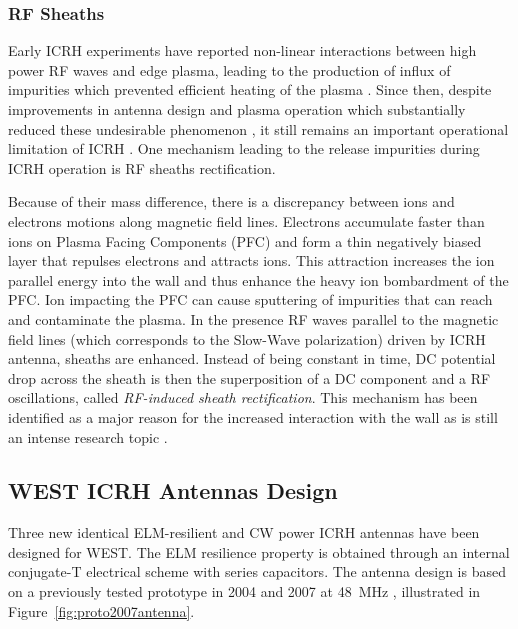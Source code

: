 \subsubsection{RF Sheaths}
Early ICRH experiments have reported non-linear interactions between high power RF waves and edge plasma, leading to the production of influx of impurities which prevented efficient heating of the plasma . Since then, despite improvements in antenna design and plasma operation which substantially reduced these undesirable phenomenon , it still remains an important operational limitation of ICRH . One mechanism leading to the release impurities during ICRH operation is RF sheaths rectification. 

Because of their mass difference, there is a discrepancy between ions and electrons motions along magnetic field lines. Electrons accumulate faster than ions on Plasma Facing Components (PFC) and form a thin negatively biased layer that repulses electrons and attracts ions. This attraction increases the ion parallel energy into the wall and thus enhance the heavy ion bombardment of the PFC. Ion impacting the PFC can cause sputtering of impurities that can reach and contaminate the plasma. In the presence RF waves parallel to the magnetic field lines (which corresponds to the Slow-Wave polarization) driven by ICRH antenna, sheaths are enhanced. Instead of being constant in time, DC potential drop across the sheath is then the superposition of a DC component and a RF oscillations, called \textit{RF-induced sheath rectification}. This  mechanism has been identified as a major reason for the increased interaction with the wall as is still an intense research topic .




\subsection{WEST ICRH Antennas Design}

Three new identical ELM-resilient and CW power ICRH antennas have been designed for WEST. The ELM resilience property is obtained through an internal conjugate-T electrical scheme with series capacitors. The antenna design is based on a previously tested prototype in 2004 and 2007 at 48~MHz , illustrated in Figure~\ref{fig:proto2007antenna}. 

